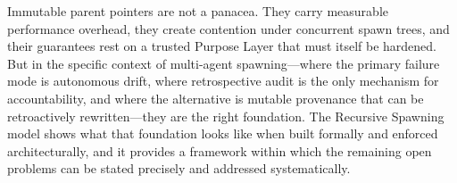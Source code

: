 Immutable parent pointers are not a panacea. They carry measurable performance overhead, they create contention under concurrent spawn trees, and their guarantees rest on a trusted Purpose Layer that must itself be hardened. But in the specific context of multi-agent spawning---where the primary failure mode is autonomous drift, where retrospective audit is the only mechanism for accountability, and where the alternative is mutable provenance that can be retroactively rewritten---they are the right foundation. The Recursive Spawning model shows what that foundation looks like when built formally and enforced architecturally, and it provides a framework within which the remaining open problems can be stated precisely and addressed systematically.
